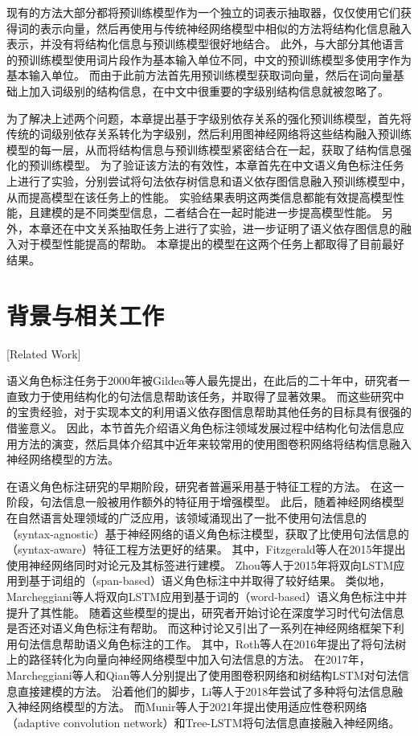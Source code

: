 现有的方法大部分都将预训练模型作为一个独立的词表示抽取器，仅仅使用它们获得词的表示向量，然后再使用与传统神经网络模型中相似的方法将结构化信息融入表示，并没有将结构化信息与预训练模型很好地结合。
此外，与大部分其他语言的预训练模型使用词片段作为基本输入单位不同，中文的预训练模型多使用字作为基本输入单位。
而由于此前方法首先用预训练模型获取词向量，然后在词向量基础上加入词级别的结构信息，在中文中很重要的字级别结构信息就被忽略了。

为了解决上述两个问题，本章提出基于字级别依存关系的强化预训练模型，首先将传统的词级别依存关系转化为字级别，然后利用图神经网络将这些结构融入预训练模型的每一层，从而将结构信息与预训练模型紧密结合在一起，获取了结构信息强化的预训练模型。
为了验证该方法的有效性，本章首先在中文语义角色标注任务上进行了实验，分别尝试将句法依存树信息和语义依存图信息融入预训练模型中，从而提高模型在该任务上的性能。
实验结果表明这两类信息都能有效提高模型性能，且建模的是不同类型信息，二者结合在一起时能进一步提高模型性能。
另外，本章还在中文关系抽取任务上进行了实验，进一步证明了语义依存图信息的融入对于模型性能提高的帮助。
本章提出的模型在这两个任务上都取得了目前最好结果。


\section{背景与相关工作}[Related Work]

语义角色标注任务于2000年被Gildea等人最先提出，在此后的二十年中，研究者一直致力于使用结构化的句法信息帮助该任务，并取得了显著效果。
而这些研究中的宝贵经验，对于实现本文的利用语义依存图信息帮助其他任务的目标具有很强的借鉴意义。
因此，本节首先介绍语义角色标注领域发展过程中结构化句法信息应用方法的演变，然后具体介绍其中近年来较常用的使用图卷积网络将结构信息融入神经网络模型的方法。

在语义角色标注研究的早期阶段，研究者普遍采用基于特征工程的方法\cite{zhao-etal-2009-multilingual-dependency,bjorkelund-etal-2009-multilingual,li-etal-2009-improving}。
在这一阶段，句法信息一般被用作额外的特征用于增强模型\cite{pradhan-etal-2005-semantic-role,che-etal-2006-hybrid}。
此后，随着神经网络模型在自然语言处理领域的广泛应用，该领域涌现出了一批不使用句法信息的（syntax-agnostic）基于神经网络的语义角色标注模型，获取了比使用句法信息的（syntax-aware）特征工程方法更好的结果。
其中，Fitzgerald等人\cite{fitzgerald-etal-2015-semantic}在2015年提出使用神经网络同时对论元及其标签进行建模。
Zhou等人\cite{zhou-xu-2015-end}于2015年将双向LSTM应用到基于词组的（span-based）语义角色标注中并取得了较好结果。
类似地，Marcheggiani等人\cite{marcheggiani-etal-2017-simple}将双向LSTM应用到基于词的（word-based）语义角色标注中并提升了其性能。
随着这些模型的提出，研究者开始讨论在深度学习时代句法信息是否还对语义角色标注有帮助。
而这种讨论又引出了一系列在神经网络框架下利用句法信息帮助语义角色标注的工作。
其中，Roth等人\cite{roth-lapata-2016-neural}在2016年提出了将句法树上的路径转化为向量向神经网络模型中加入句法信息的方法。
在2017年，Marcheggiani等人\cite{marcheggiani-titov-2017-encoding}和Qian等人\cite{qian-etal-2017-syntax}分别提出了使用图卷积网络和树结构LSTM对句法信息直接建模的方法。
沿着他们的脚步，Li等人\cite{li-etal-2018-unified}于2018年尝试了多种将句法信息融入神经网络模型的方法。
而Munir等人\cite{munir-etal-2021-adaptive}于2021年提出使用适应性卷积网络（adaptive convolution network）和Tree-LSTM将句法信息直接融入神经网络。

